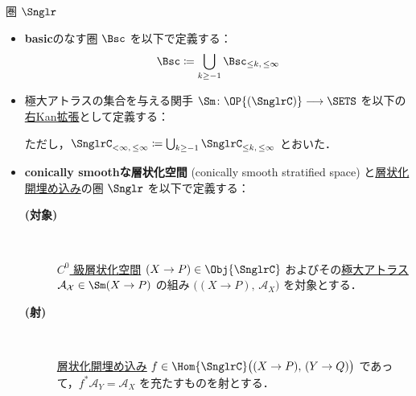 \documentclass[TQFT_main]{subfiles}
\begin{document}
\begin{mydef}[label=def:Snglr]{圏 $\Snglr$}
    \begin{itemize}
        \item \textbf{basic}のなす圏 $\Bsc$ を以下で定義する：
        \begin{align}
            \Bsc \coloneqq \bigcup_{k \ge -1} \Bsc_{\le k,\, \le \infty}
        \end{align}
        \item 極大アトラスの集合を与える関手 $\Sm \colon \OP{(\SnglrC)} \lto \SETS$ を以下の\hyperref[def:Kanext]{右Kan拡張}として定義する：
        \begin{center}
        \end{center}
        ただし，$\SnglrC_{< \infty,\, \le \infty} \coloneqq \bigcup_{k \ge -1} \SnglrC_{\le k,\, \le \infty}$ とおいた．
        \item \textbf{conically smoothな層状化空間} (conically smooth stratified space) と\hyperref[def:strat-emb]{層状化開埋め込み}の圏 $\Snglr$ を以下で定義する：
        
        \begin{description}
            \item[\textbf{(対象)}]　
            
            \hyperref[def:Snglr-C0]{$C^0$ 級層状化空間} $(X \to P) \in \Obj{\SnglrC}$ およびその\hyperref[def:Sm-induction]{極大アトラス} $\mathcal{A_X} \in \Sm (X \to P)$ の組み $\bigl((X\to P),\, \mathcal{A}_X\bigr)$ を対象とする．
        
            \item[\textbf{(射)}]　
            
            \hyperref[def:strat-emb]{層状化開埋め込み} $f \in \Hom{\SnglrC} \bigl((X \to P),\, (Y \to Q)\bigr)$ であって，$f^* \mathcal{A}_Y = \mathcal{A}_X$ を充たすものを射とする．
        \end{description}
    \end{itemize}
    
\end{mydef}
\end{document}
